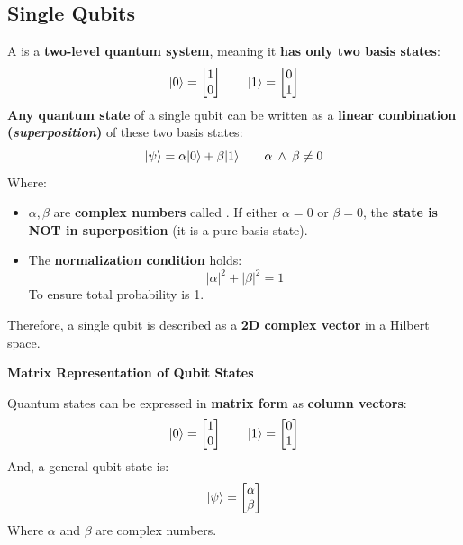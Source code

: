 \subsection{Single Qubits}

A  is a \textbf{two-level quantum system}, meaning it \textbf{has only two basis states}:
\begin{equation*}
    | 0 \rangle = \begin{bmatrix}
        1 \\ 0
    \end{bmatrix}
    \hspace{2em}
    | 1 \rangle = \begin{bmatrix}
        0 \\ 1
    \end{bmatrix}
\end{equation*}
\textbf{Any quantum state} of a single qubit can be written as a \textbf{linear combination (\emph{superposition})} of these two basis states:
\begin{equation*}
    | \psi \rangle = \alpha | 0 \rangle + \beta | 1 \rangle \hspace{2em} \alpha \: \land \: \beta \ne 0
\end{equation*}
Where:
\begin{itemize}
    \item $\alpha, \beta$ are \textbf{complex numbers} called . If either $\alpha = 0$ or $\beta = 0$, the \textbf{state is NOT in superposition} (it is a pure basis state).
    \item The \textbf{normalization condition} holds:
    \begin{equation*}
        \left|\alpha\right|^{2} + \left|\beta\right|^{2} = 1
    \end{equation*}
    To ensure total probability is 1.
\end{itemize}
Therefore, a single qubit is described as a \textbf{2D complex vector} in a Hilbert space.

\begin{flushleft}
    \textcolor{Green3}{ \textbf{Matrix Representation of Qubit States}}
\end{flushleft}
Quantum states can be expressed in \textbf{matrix form} as \textbf{column vectors}:
\begin{equation*}
    | 0 \rangle = \begin{bmatrix}
        1 \\ 0
    \end{bmatrix}
    \hspace{2em}
    | 1 \rangle = \begin{bmatrix}
        0 \\ 1
    \end{bmatrix}
\end{equation*}
And, a general qubit state is:
\begin{equation*}
    | \psi \rangle = \begin{bmatrix}
        \alpha \\ \beta
    \end{bmatrix}
\end{equation*}
Where $\alpha$ and $\beta$ are complex numbers.

